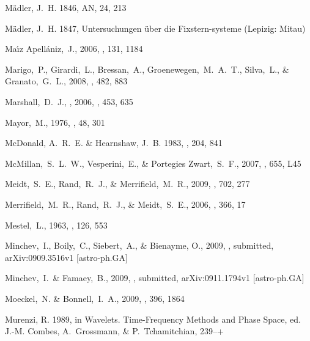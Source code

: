 \begin{thebibliography}{99}
{M{\"a}dler}, J.~H. 1846, AN, 24, 213

{M{\"a}dler}, J.~H. 1847, {Untersuchungen {\"u}ber die Fixstern-systeme}
  (Lepizig: Mitau)

  Ma{\'{\i}}z Apell{\'a}niz,~J., 2006,
  \aj, 131, 1184

  Marigo,~P., Girardi,~L., Bressan,~A., Groenewegen,~M.~A.~T., Silva,~L., \& Granato,~G.~L., 2008,
  \aap, 482, 883

  Marshall,~D.~J., \etal, 2006,
  \aap, 453, 635

  Mayor,~M., 1976,
  \aap, 48, 301

{McDonald}, A.~R.~E. \& {Hearnshaw}, J.~B. 1983, \mnras, 204, 841

  McMillan,~S.~L.~W., Vesperini,~E., \& Portegies Zwart,~S.~F., 2007,
  \apjl, 655, L45

  Meidt,~S.~E., Rand,~R.~J., \& Merrifield,~M.~R., 2009,
  \apj, 702, 277

  Merrifield,~M.~R., Rand,~R.~J., \& Meidt,~S.~E., 2006,
  \mnras, 366, 17

  Mestel,~L., 1963,
  \mnras, 126, 553

  Minchev,~I., Boily,~C., Siebert,~A., \& Bienayme, O., 2009,
  \mnras, submitted,
  arXiv:0909.3516v1 [astro-ph.GA]

  Minchev,~I.~\& Famaey,~B., 2009,
  \apjl, submitted,
  arXiv:0911.1794v1 [astro-ph.GA]

  Moeckel,~N. \& Bonnell,~I.~A., 2009,
  \mnras, 396, 1864

{Murenzi}, R. 1989, in Wavelets. Time-Frequency Methods and Phase Space, ed.
  J.-M. {Combes}, A.~{Grossmann}, \& P.~{Tchamitchian}, 239--+


\end{thebibliography}
